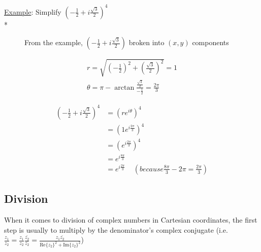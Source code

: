 \documentclass[]{article}
\begin{document}
         \noindent \underline{Example}: Simplify $(-\frac{1}{2}+i\frac{\sqrt{3}}{2})^4$ \\* 
         
        \begin{figure}[!h]
			\centering
			\caption{From the example, $(-\frac{1}{2}+i\frac{\sqrt{3}}{2})$ broken into $(x,y)$ components}
		\end{figure}
         
         \begin{gather}
             r=\sqrt{(-\frac{1}{2})^2 + (\frac{\sqrt{3}}{2})^2} = 1 \\ 
             \theta=\pi - \arctan{\frac{\frac{\sqrt{3}}{2}}{-\frac{1}{2}}} = \frac{2\pi}{3}
         \end{gather}
         
         \begin{align}
             (-\frac{1}{2}+i\frac{\sqrt{3}}{2})^4 &= (re^{i\theta})^4 \\
             &= (1e^{i\frac{2\pi}{3}})^4 \\
             &= (e^{i\frac{2\pi}{3}})^4 \\
             &= e^{i\frac{8\pi}{3}} \\
             &= e^{i\frac{2\pi}{3}} \;\;\;\; (because \frac{8\pi}{3} - 2\pi = \frac{2\pi}{3})
         \end{align}
    \subsection{Division}
        When it comes to division of complex numbers in Cartesian coordinates, the first step is usually to multiply by the denominator's complex conjugate (i.e. $\frac{z_1}{z_2}=\frac{z_1}{z_2}\frac{\bar{z_2}}{\bar{z_2}}=\frac{z_1\bar{z_2}}{\mathrm{Re}\{z_2\}^2+\mathrm{Im}\{z_2\}^2}$)
\end{document}
